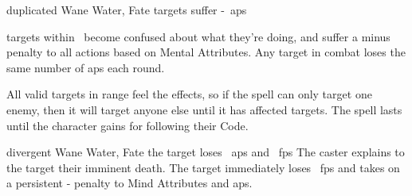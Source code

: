   {duplicated}%
  {Wane}%
  {Water, Fate}%
  {}%
  { targets suffer -~\glspl{ap}}%
  {
     targets within \spellRange\ become confused about what they're doing, and suffer a minus  penalty to all actions based on Mental Attributes.
    Any target in combat loses the same number of \glspl{ap} each round.

    All valid targets in range feel the effects, so if the spell can only target one enemy, then it will target anyone else until it has affected  targets.
    The spell lasts until the character gains  for following their Code.
  }

  {divergent}%
  {Wane}%
  {Water, Fate}%
  {}%
  {the target loses ~\glspl{ap} and \showDam~\glspl{fp}}%
  {
    The caster explains to the target their imminent death.
    The target immediately loses \showDam\ \glspl{fp} and takes on a persistent - penalty to Mind Attributes and \glspl{ap}.
  }
